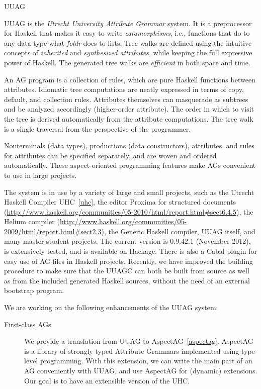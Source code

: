 \begin{hcarentry}[updated]{UUAG}
\label{uuag}
\makeheader

UUAG is the \emph{Utrecht University Attribute Grammar} system. It is a preprocessor for Haskell
that makes it easy to write \emph{catamorphisms}, i.e., functions that do to any data type what
\emph{foldr} does to lists. Tree walks are defined using the intuitive concepts of
\emph{inherited} and \emph{synthesized attributes}, while keeping the full expressive power
of Haskell. The generated tree walks are \emph{efficient} in both space and time.

An AG program is a collection of rules, which are pure Haskell functions between attributes.
Idiomatic tree computations are neatly expressed in terms of copy, default, and collection rules.
Attributes themselves can masquerade as subtrees and be analyzed accordingly (higher-order attribute). The order in which to visit the tree is derived automatically from the attribute computations. The tree walk is a single traversal from the perspective of the programmer.

Nonterminals (data types), productions (data constructors), attributes, and rules for attributes can be specified separately, and are woven and ordered automatically. These aspect-oriented programming features make AGs convenient to use in large projects.

The system is in use by a variety of large and small projects, such as the Utrecht Haskell Compiler UHC~\cref{uhc}, the editor Proxima for structured documents (\url{http://www.haskell.org/communities/05-2010/html/report.html#sect6.4.5}), the Helium compiler (\url{http://www.haskell.org/communities/05-2009/html/report.html#sect2.3}), the Generic Haskell compiler, UUAG itself, and many master student projects.
The current version is 0.9.42.1 (November 2012), is extensively tested, and is available on Hackage. There is also a Cabal plugin for easy use of AG files in Haskell projects.
Recently, we have improved the building procedure to make sure that the UUAGC can both be built from source as well as from the included generated Haskell sources, without the need of an external bootstrap program.

We are working on the following enhancements of the UUAG system:
\begin{description}
\item[First-class AGs]
  We provide a translation from UUAG to AspectAG~\cref{aspectag}.
  AspectAG is a library of strongly typed Attribute Grammars
  implemented using type-level programming. With this extension, we can write the main part of
  an AG conveniently with UUAG, and use AspectAG for (dynamic) extensions. Our goal is to have
  an extensible version of the UHC.


\end{description}
\end{hcarentry}
